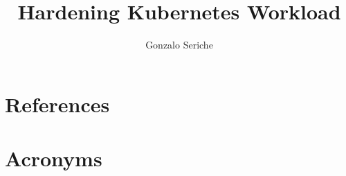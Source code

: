 \documentclass[PMO,lsstdraft,authoryear,toc]{lsstdoc}
\title{Hardening Kubernetes Workload}
\author{%
Gonzalo Seriche
}
\date{\vcsDate}
\begin{document}
\maketitle


\appendix
\section{References} \label{sec:bib}
\renewcommand{\refname}{} %


\section{Acronyms} \label{sec:acronyms}

\end{document}
